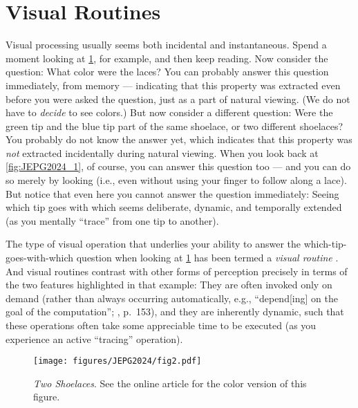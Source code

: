 \section{Visual Routines}
Visual processing usually seems both incidental and instantaneous. Spend a moment looking at \cref{fig:JEPG2024_2}, for example, and then keep reading. Now consider the question: What color were the laces? You can probably answer this question immediately, from memory --- indicating that this property was extracted even before you were asked the question, just as a part of natural viewing. (We do not have to \textit{decide} to see colors.) But now consider a different question: Were the green tip and the blue tip part of the same shoelace, or two different shoelaces? You probably do not know the answer yet, which indicates that this property was \textit{not} extracted incidentally during natural viewing. When you look back at \cref{fig:JEPG2024_1}, of course, you can answer this question too --- and you can do so merely by looking (i.e., even without using your finger to follow along a lace). But notice that even here you cannot answer the question immediately: Seeing which tip goes with which seems deliberate, dynamic, and temporally extended (as you mentally “trace” from one tip to another).

The type of visual operation that underlies your ability to answer the which-tip-goes-with-which question when looking at \cref{fig:JEPG2024_2} has been termed a \textit{visual routine} \parencite{ullman_visual_1984,ullman_chapter_1996}. And visual routines contrast with other forms of perception precisely in terms of the two features highlighted in that example: They are often invoked only on demand (rather than always occurring automatically, e.g., “depend[ing] on the goal of the computation”; \cite{ullman_visual_1984}, p.~153), and they are inherently dynamic, such that these operations often take some appreciable time to be executed (as you experience an active “tracing” operation).
\begin{figure}
    \centering
    \texttt{[image: figures/JEPG2024/fig2.pdf]}
    \caption
    {\textit{Two Shoelaces}. See the online article for the color version of this figure.}
    \label{fig:JEPG2024_2}
\end{figure}

